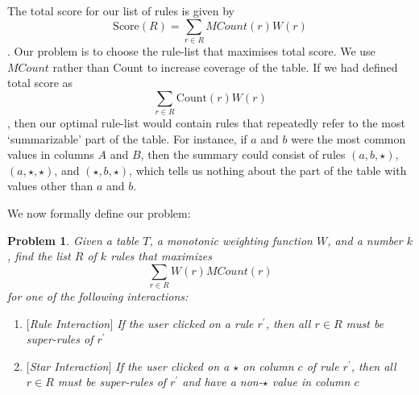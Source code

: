 \documentclass{sig-alternate}
\newcounter{prob}
\newtheorem{problem}[prob]{Problem}
\begin{document}
The total score for our list of rules is given by $$\text{Score}(R) = \sum_{r \in R} MCount(r)W(r)$$. Our problem is to choose the rule-list that maximises total score. We use $MCount$ rather than Count to increase coverage of the table. If we had defined total score as $$\sum_{r \in R} \text{Count}(r)W(r)$$, then our optimal rule-list would contain rules that repeatedly refer to the most `summarizable' part of the table. For instance, if $a$ and $b$ were the most common values in columns $A$ and $B$, then the summary could consist of rules $(a, b, \star)$, $(a, \star, \star)$, and $(\star, b, \star)$, which tells us nothing about the part of the table with values other than $a$ and $b$.

We now formally define our problem:

\begin{problem}\label{prob:optimal-subrule-list}
Given a table $T$, a monotonic weighting function $W$, and a number $k$, find the list $R$ of $k$ rules that maximizes 
$$\sum_{r \in R} W(r)MCount(r)$$
for one of the following interactions:
\begin{enumerate}
\item $[$Rule Interaction$]$ If the user clicked on a rule $r^{\prime}$, then all $r \in R$ must be super-rules of $r^{\prime}$
\item $[$Star Interaction$]$ If the user clicked on a $\star$ on column $c$ of rule $r^{\prime}$, then all $r \in R$ must be super-rules of $r^{\prime}$ and have a non-$\star$ value in column $c$
\end{enumerate}
\end{problem}

\end{document}
